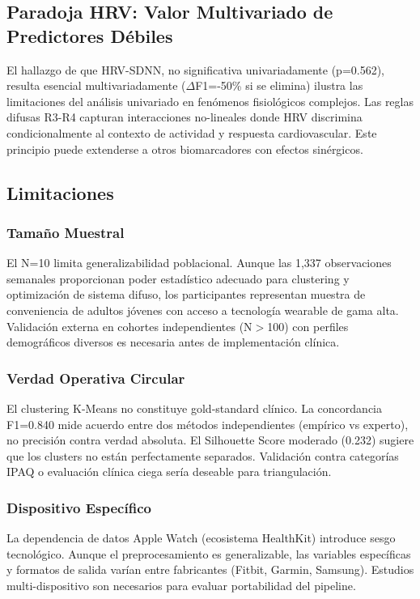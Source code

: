 \documentclass[journal,twoside,web]{ieeecolor}
\begin{document}
\subsection{Paradoja HRV: Valor Multivariado de Predictores Débiles}
El hallazgo de que HRV-SDNN, no significativa univariadamente (p=0.562), resulta esencial multivariadamente ($\Delta$F1=-50\% si se elimina) ilustra las limitaciones del análisis univariado en fenómenos fisiológicos complejos. Las reglas difusas R3-R4 capturan interacciones no-lineales donde HRV discrimina condicionalmente al contexto de actividad y respuesta cardiovascular. Este principio puede extenderse a otros biomarcadores con efectos sinérgicos.

\subsection{Limitaciones}

\subsubsection{Tamaño Muestral}
El N=10 limita generalizabilidad poblacional. Aunque las 1,337 observaciones semanales proporcionan poder estadístico adecuado para clustering y optimización de sistema difuso, los participantes representan muestra de conveniencia de adultos jóvenes con acceso a tecnología wearable de gama alta. Validación externa en cohortes independientes (N$>$100) con perfiles demográficos diversos es necesaria antes de implementación clínica.

\subsubsection{Verdad Operativa Circular}
El clustering K-Means no constituye gold-standard clínico. La concordancia F1=0.840 mide acuerdo entre dos métodos independientes (empírico vs experto), no precisión contra verdad absoluta. El Silhouette Score moderado (0.232) sugiere que los clusters no están perfectamente separados. Validación contra categorías IPAQ o evaluación clínica ciega sería deseable para triangulación.

\subsubsection{Dispositivo Específico}
La dependencia de datos Apple Watch (ecosistema HealthKit) introduce sesgo tecnológico. Aunque el preprocesamiento es generalizable, las variables específicas y formatos de salida varían entre fabricantes (Fitbit, Garmin, Samsung). Estudios multi-dispositivo son necesarios para evaluar portabilidad del pipeline.
\end{document}
